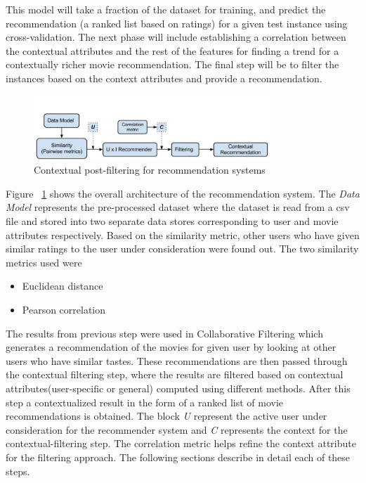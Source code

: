 \documentclass{article}
\begin{document}
This model will take a fraction of the dataset for training, and predict the recommendation (a ranked list based on ratings) for a given test instance using cross-validation. The next phase will include establishing a correlation between the contextual attributes and the rest of the features for finding a trend for a contextually richer movie recommendation. The final step will be to filter the instances based on the context attributes and provide a recommendation. 

\begin{figure}[H]
\centering
\includegraphics[width=3.5in]{archdiagram.jpg}
\caption{Contextual post-filtering for recommendation systems}
\label{archdiag}
\end{figure}

Figure ~\ref{archdiag} shows the overall architecture of the recommendation system. The \textit{Data Model} represents the pre-processed dataset where the dataset is read from a csv file and stored into two separate data stores corresponding to user and movie attributes respectively. Based on the similarity metric, other users who have given similar ratings to the user under consideration were found out.     The two similarity metrics used were

\begin{itemize}
\item Euclidean distance 
\item Pearson correlation
\end{itemize}


The results from previous step were used in Collaborative Filtering which generates a recommendation of the movies for given user by looking at other users who have similar tastes. These recommendations are then passed through the contextual filtering step, where the results are filtered based on contextual attributes(user-specific or general) computed using different methods. After this step a contextualized result in the form of a ranked list of movie recommendations is obtained. The block \textit{U} represent the active user under consideration for the recommender system and \textit{C} represents the context for the contextual-filtering step. The correlation metric helps refine the context attribute for the filtering approach. The following sections describe in detail each of these steps.
\end{document}

